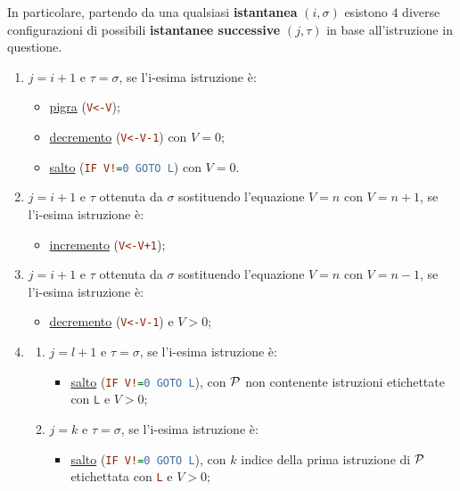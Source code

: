 In particolare, partendo da una qualsiasi \textbf{istantanea} \((i,\sigma)\) esistono \(4\) diverse configurazioni di possibili \textbf{istantanee successive} \((j,\tau)\) in base all'istruzione in questione.
\begin{enumerate}
  \item \(j=i+1\) e \(\tau = \sigma\), se l'i-esima istruzione è:
  \begin{itemize}
    \item \underline{pigra} (\lstinline[language=ini]{V<-V});
    \item \underline{decremento} (\lstinline[language=ini]{V<-V-1}) con \(V=0\);
    \item \underline{salto} (\lstinline[language=ini]{IF V!=0 GOTO L}) con \(V=0\).
  \end{itemize}
  \item \(j=i+1\) e \(\tau\) ottenuta da \(\sigma\) sostituendo l'equazione \(V=n\) con \(V=n+1\), se l'i-esima istruzione è:
  \begin{itemize}
    \item \underline{incremento} (\lstinline[language=ini]{V<-V+1});
  \end{itemize}
  \item \(j=i+1\) e \(\tau\) ottenuta da \(\sigma\) sostituendo l'equazione \(V=n\) con \(V=n-1\), se l'i-esima istruzione è:
  \begin{itemize}
    \item \underline{decremento} (\lstinline[language=ini]{V<-V-1}) e \(V>0\);
  \end{itemize}
  \item \begin{enumerate}
          \item \(j=l+1\) e \(\tau = \sigma\), se l'i-esima istruzione è:
          \begin{itemize}
            \item \underline{salto} (\lstinline[language=ini]{IF V!=0 GOTO L}), con \(\mathcal{P}\) non contenente istruzioni etichettate con \lstinline[language=ini]{L} e \(V>0\);
          \end{itemize}
          \item \(j=k\) e \(\tau = \sigma\), se l'i-esima istruzione è:
          \begin{itemize}
            \item \underline{salto} (\lstinline[language=ini]{IF V!=0 GOTO L}), con \(k\) indice della prima istruzione di \(\mathcal{P}\) etichettata con \lstinline[language=ini]{L} e \(V>0\);
          \end{itemize}
        \end{enumerate}
\end{enumerate}

